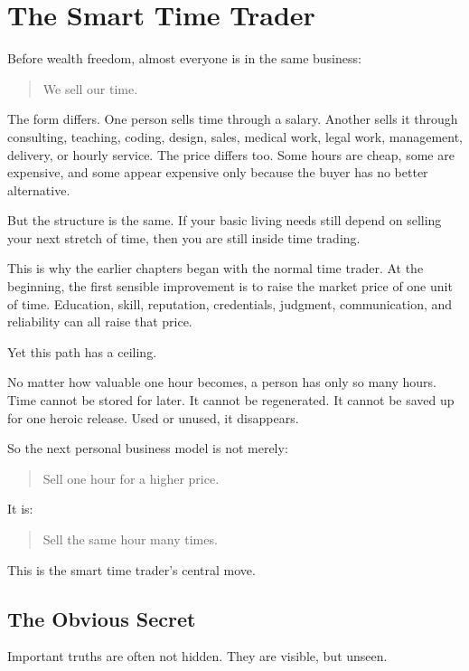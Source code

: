 \chapter{The Smart Time Trader}

Before wealth freedom, almost everyone is in the same business:

\begin{quote}
We sell our time.
\end{quote}

The form differs. One person sells time through a salary. Another sells it through consulting, teaching, coding, design, sales, medical work, legal work, management, delivery, or hourly service. The price differs too. Some hours are cheap, some are expensive, and some appear expensive only because the buyer has no better alternative.

But the structure is the same. If your basic living needs still depend on selling your next stretch of time, then you are still inside time trading.

This is why the earlier chapters began with the normal time trader. At the beginning, the first sensible improvement is to raise the market price of one unit of time. Education, skill, reputation, credentials, judgment, communication, and reliability can all raise that price.

Yet this path has a ceiling.

No matter how valuable one hour becomes, a person has only so many hours. Time cannot be stored for later. It cannot be regenerated. It cannot be saved up for one heroic release. Used or unused, it disappears.

So the next personal business model is not merely:

\begin{quote}
Sell one hour for a higher price.
\end{quote}

It is:

\begin{quote}
Sell the same hour many times.
\end{quote}

This is the smart time trader's central move.

\section*{The Obvious Secret}

Important truths are often not hidden. They are visible, but unseen.

